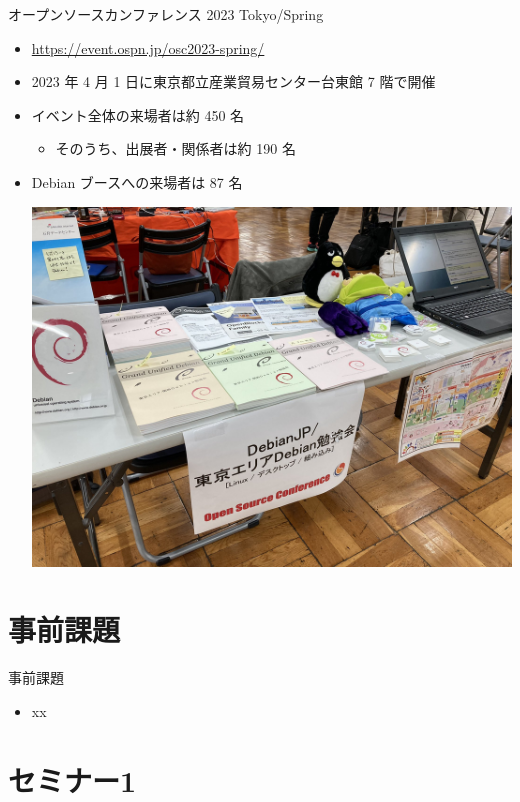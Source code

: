 \begin{frame}{オープンソースカンファレンス 2023 Tokyo/Spring}
\begin{itemize}
\item \url{https://event.ospn.jp/osc2023-spring/}  
\item 2023 年 4 月 1 日に東京都立産業貿易センター台東館 7 階で開催
\item イベント全体の来場者は約 450 名
  \begin{itemize}
  \item そのうち、出展者・関係者は約 190 名
  \end{itemize}
\item Debian ブースへの来場者は 87 名
\begin{center}
  \includegraphics[width=0.4\hsize]{image202304/osc2023spring-booth.jpg}
\end{center}
\end{itemize}
\end{frame}


\section{事前課題}


\begin{frame}{事前課題}
  \begin{itemize}
  \item xx
  \end{itemize}
\end{frame}

{\footnotesize
 
}

%

\section{セミナー1}

